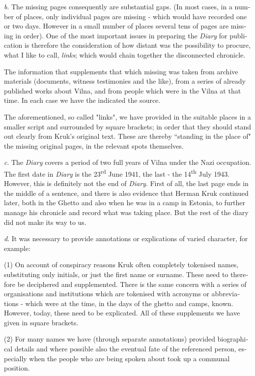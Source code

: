 \documentclass{article}
\begin{document}
\begin{pairs}
\begin{Leftside}
\begin{english}
\emph{b}. The missing pages consequently are substantial gaps. (In most cases, in a number of places, only individual pages are missing - which would have recorded one or two days. 
However in a small number of places several tens of pages are missing in order). 
One of the most important issues in preparing the \emph{Diary} for publication is
therefore the consideration of how distant was the possibility to procure, what I like to call, \emph{links};
which would chain together the disconnected chronicle.

The information that supplements that which missing was taken from archive materials 
(documents, witness testimonies and the like), from a series of already published works
about Vilna, and from people which were in the Vilna at that time. In each case we have the
indicated the source.
 
The aforementioned, so called "links", we have provided in the suitable places in a smaller
script and surrounded by square brackets; in order that they should stand out clearly from 
Kruk's original text. 
These are thereby ``standing in the place of" the missing original pages, in the relevant spots themselves.

\emph{c}. The \emph{Diary} covers a period of two full years of Vilna under the Nazi occupation.
The first date in \emph{Diary} is the 23\textsuperscript{rd} June 1941, the last - the 14\textsuperscript{th}
July 1943. However, this is definitely not the end of \emph{Diary}. First of all, the 
last page ends in the middle of a sentence, and there is also evidence that
Herman Kruk continued later, both in the Ghetto and also when he was in a camp in Estonia,
to further manage his chronicle and record what was taking place. But the rest of the diary
did not make its way to us.

\emph{d}. It was necessary to provide annotations or explications of varied character, for example:


(1) On account of conspiracy reasons Kruk often completely tokenised names, substituting
only initials, or just the first name or surname. These need to therefore be deciphered and
supplemented. There is the same concern with a series of organisations and institutions which
are tokenised with acronyms or abbreviations - which were at the time, in the days of the
ghetto and camps, known. However, today, these need to be explicated. All of these supplements we
have given in square brackets.

(2) For many names we have (through separate annotations) provided biographical details
and where possible also the eventual fate of the referenced person, especially when the people
who are being spoken about took up a communal position.


\end{english}
\end{Leftside}
\end{pairs}
\end{document}
